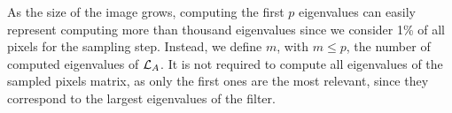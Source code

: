 As the size of the image grows, computing the first \(p\) eigenvalues can easily represent computing more than thousand eigenvalues since we consider 1\% of all pixels for the sampling step.
Instead, we define \(m\), with \(m \le p\), the number of computed eigenvalues of \(\operatorname{\mathcal{L}}_A\).
It is not required to compute all eigenvalues of the sampled pixels matrix, as only the first ones are the most relevant, since they correspond to the largest eigenvalues of the filter.
